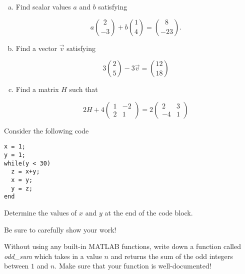 \documentclass[11pt]{exam}
\theoremstyle{definition}
\begin{document}
\begin{questions}
\newpage
\question[10]\mbox{}

\begin{enumerate}[(a)]
\item Find scalar values $a$ and $b$ satisfying

$$a\binom{2}{-3} + b\binom{1}{4} = \binom{8}{-23}.$$
\vspace{2in}

\item Find a vector $\vec v$ satisfying

$$3\binom{2}{5} -3\vec v = \binom{12}{18}$$
\vspace{2in}

\item Find a matrix $H$ such that

$$
2H
+
4\left(\begin{array}{cc}
1 & -2\\2 & 1
\end{array}\right)
=
2\left(\begin{array}{cc}
2 & 3\\-4 & 1
\end{array}\right)
$$

\end{enumerate}

\newpage
\question[10]\mbox{}
Consider the following code

\begin{lstlisting}
x = 1;
y = 1;
while(y < 30)
  z = x+y;
  x = y;
  y = z;
end
\end{lstlisting}

Determine the values of $x$ and $y$ at the end of the code block.

Be sure to carefully show your work!


\newpage
\question[10]\mbox{}
Without using any built-in MATLAB functions, write down a function called \textit{odd\_sum} which takes in a value $n$ and returns the sum of the odd integers between $1$ and $n$.
Make sure that your function is well-documented!


\end{questions}
\end{document}

